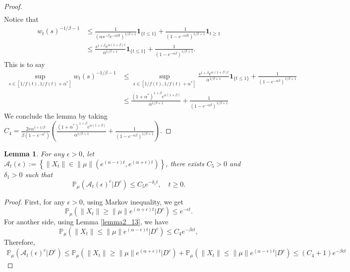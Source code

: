 \documentclass[12pt,oneside,english]{amsart}
\theoremstyle{plain}
\newtheorem{lem}[thm]{Lemma}
\theoremstyle{definition}
\numberwithin{equation}{section}
\begin{document}
\begin{proof}
\begin{align*}
\end{align*}
Notice that
\begin{align*}
    w_t(s)^{-1/\beta-1}&\leq \frac{1}{(\alpha s^{-\beta}e^{-\alpha \beta t})^{1/
    \beta+1}}\mathbf{1}_{\{t\leq 1\}}+\frac{1}{(1-e^{-\alpha\beta t})^{1/\beta+1}}\mathbf{1}_{t\geq 1}\\
    &\leq \frac{s^{1+\beta}e^{\alpha(1+\beta)t}}{\alpha^{1/\beta +1}}\mathbf{1}_{\{t\leq 1\}}+\frac{1}{(1-e^{-\alpha\beta })^{1/\beta+1}}.
\end{align*}
This is to say
\begin{align*}
    \sup_{s\in [1/f(t),1/f(t)+\alpha^*]}w_t(s)^{-1/\beta-1}&\leq\sup_{s\in [1/f(t),1/f(t)+\alpha^*]}\frac{s^{1+\beta}e^{\alpha(1+\beta)t}}{\alpha^{1/\beta +1}}\mathbf{1}_{\{t\leq 1\}}+\frac{1}{(1-e^{-\alpha\beta })^{1/\beta+1}}\\
    &\leq \frac{(1+\alpha^*)^{1+\beta}e^{\alpha(1+\beta)}}{\alpha^{1/\beta+1}}+\frac{1}{(1-e^{-\alpha\beta })^{1/\beta+1}}
\end{align*}
We conclude the lemma by taking $C_4= \frac{2 e \alpha^{1+1/\beta}}{\beta (1-e^{-\alpha^*})}\left(\frac{(1+\alpha^*)^{1+\beta}e^{\alpha(1+\beta)}}{\alpha^{1/\beta+1}}+\frac{1}{(1-e^{-\alpha\beta })^{1/\beta+1}}\right)$.
\end{proof}
\begin{lem}\label{lemma28}
  For any $\epsilon>0$, let $\mathcal{A}_t(\epsilon):=\left\{ \|X_t\|\in \|\mu\|\left(e^{(\alpha-\epsilon)t},e^{(\alpha+\epsilon)t}\right)\right\}$, there exists $C_5>0$ and $\delta_1>0$ such that
  $$\mathbb{P}_{\mu}\left(\mathcal{A}_t(\epsilon)^c|D^c\right)\leq C_5 e^{-\delta_1 t},\quad t\geq 0.$$
\end{lem}

\begin{proof}
    First, for any $\epsilon>0$, using Markov inequality, we get
    $$\mathbb{P}_{\mu}(\|X_t\|\geq\|\mu\|e^{(\alpha+\epsilon)t}|D^c)\leq e^{-\epsilon t}.$$
    For another side, using Lemma \ref{lemma2_13}, we have
    $$\mathbb{P}_{\mu}\left(\|X_t\|\leq \|\mu\|e^{(\alpha-\epsilon)t}|D^c\right)\leq C_4 e^{-\beta\epsilon t}, $$
Therefore,
\begin{align*}
    \mathbb{P}_{\mu}\left(\mathcal{A}_t(\epsilon)^c|D^c\right)\leq \mathbb{P}_{\mu}(\|X_t\|\geq\|\mu\|e^{(\alpha+\epsilon)t}|D^c)+\mathbb{P}_{\mu}\left(\|X_t\|\leq \|\mu\|e^{(\alpha-\epsilon)t}|D^c\right)\leq(C_4+1)e^{-\beta \epsilon t }
\end{align*}
\end{proof}
\end{document}
